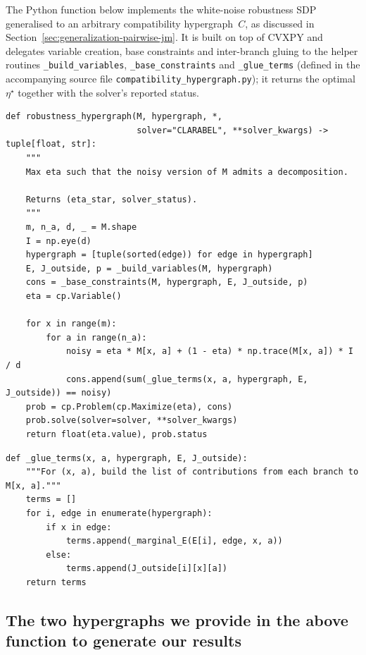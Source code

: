 \documentclass[oneside, a4paper, onecolumn, 11pt]{article}
\theoremstyle{definition}
\theoremstyle{plain}
\theoremstyle{remark}
\begin{document}
The Python function below implements the white-noise robustness SDP
generalised to an arbitrary compatibility hypergraph~$C$, as discussed in
Section~\ref{sec:generalization-pairwise-jm}. It is built on top of CVXPY and delegates
variable creation, base constraints and inter-branch gluing to the
helper routines \texttt{\_build\_variables},
\texttt{\_base\_constraints} and \texttt{\_glue\_terms} (defined in the
accompanying source file \texttt{compatibility\_hypergraph.py}); it
returns the optimal $\eta^{\star}$ together with the solver's reported
status.

\begin{lstlisting}[style=python,
                   caption={\texttt{robustness\_hypergraph}: noise-robustness SDP for an arbitrary compatibility hypergraph.},
                   label=lst:robustness-hypergraph]
def robustness_hypergraph(M, hypergraph, *,
                          solver="CLARABEL", **solver_kwargs) -> tuple[float, str]:
    """
    Max eta such that the noisy version of M admits a decomposition.

    Returns (eta_star, solver_status).
    """
    m, n_a, d, _ = M.shape
    I = np.eye(d)
    hypergraph = [tuple(sorted(edge)) for edge in hypergraph]
    E, J_outside, p = _build_variables(M, hypergraph)
    cons = _base_constraints(M, hypergraph, E, J_outside, p)
    eta = cp.Variable()
    
    for x in range(m):
        for a in range(n_a):
            noisy = eta * M[x, a] + (1 - eta) * np.trace(M[x, a]) * I / d
            cons.append(sum(_glue_terms(x, a, hypergraph, E, J_outside)) == noisy)
    prob = cp.Problem(cp.Maximize(eta), cons)
    prob.solve(solver=solver, **solver_kwargs)
    return float(eta.value), prob.status
\end{lstlisting}

\begin{lstlisting}[style=python,
                   caption={\texttt{\_glue\_terms}: helper function that builds the list of contributions from each branch to $M_{x|a}$.},
                   label=lst:glue-terms]
def _glue_terms(x, a, hypergraph, E, J_outside):
    """For (x, a), build the list of contributions from each branch to M[x, a]."""
    terms = []
    for i, edge in enumerate(hypergraph):
        if x in edge:
            terms.append(_marginal_E(E[i], edge, x, a))
        else:
            terms.append(J_outside[i][x][a])
    return terms
\end{lstlisting}

\subsection{The two hypergraphs we provide in the above function to generate our results}
\label{app:hypergraph-helpers}
\end{document}
